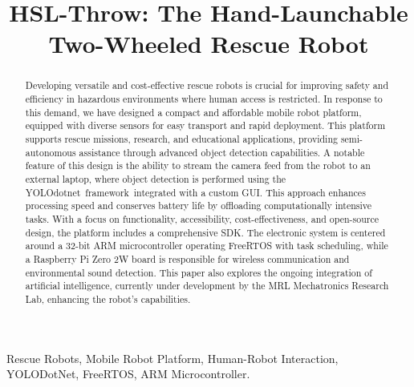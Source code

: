 \documentclass[conference]{IEEEtran}
\begin{document}
\title{HSL-Throw: The Hand-Launchable Two-Wheeled Rescue Robot}

\author{
\and
{}
}
\maketitle

\begin{abstract}
Developing versatile and cost-effective rescue robots is crucial for improving safety and efficiency in hazardous environments where human access is restricted. In response to this demand, we have designed a compact and affordable mobile robot platform, equipped with diverse sensors for easy transport and rapid deployment. This platform supports rescue missions, research, and educational applications, providing semi-autonomous assistance through advanced object detection capabilities. A notable feature of this design is the ability to stream the camera feed from the robot to an external laptop, where object detection is performed using the \mbox{YOLOdotnet framework integrated} with a custom GUI. This approach enhances processing speed and conserves battery life by offloading computationally intensive tasks. With a focus on functionality, accessibility, cost-effectiveness, and open-source design, the platform includes a comprehensive SDK. The electronic system is centered around a 32-bit ARM microcontroller operating FreeRTOS with task scheduling, while a Raspberry Pi Zero 2W board is responsible for wireless communication and environmental sound detection. This paper also explores the ongoing integration of artificial intelligence, currently under development by the MRL Mechatronics Research Lab, enhancing the robot's capabilities.\\
\end{abstract}

\begin{IEEEkeywords}
Rescue Robots, Mobile Robot Platform, Human-Robot Interaction, YOLODotNet, FreeRTOS, ARM Microcontroller.
\end{IEEEkeywords}
\end{document}
